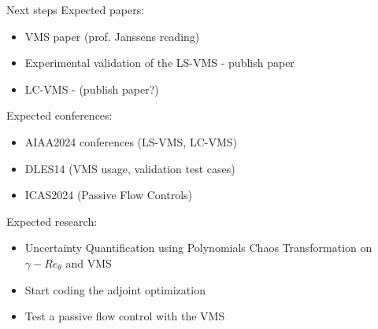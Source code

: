     \begin{frame}{Next steps}
    Expected papers:
    \begin{itemize}
        \item VMS paper (prof. Janssens reading)
        \item Experimental validation of the LS-VMS - publish paper
        \item LC-VMS - (publish paper?)
    \end{itemize}
    
    Expected conferences:
    \begin{itemize}
        \item AIAA2024 conferences (LS-VMS, LC-VMS)
        \item DLES14 (VMS usage, validation test cases)
        \item ICAS2024 (Passive Flow Controls)
    \end{itemize}
    
    
    Expected research:
    \begin{itemize}
        \item Uncertainty Quantification using Polynomials Chaos Transformation on $\gamma-Re_\theta$ and VMS
        \item Start coding the adjoint optimization
        \item Test a passive flow control with the VMS
    \end{itemize}
    
    \end{frame}
    
    